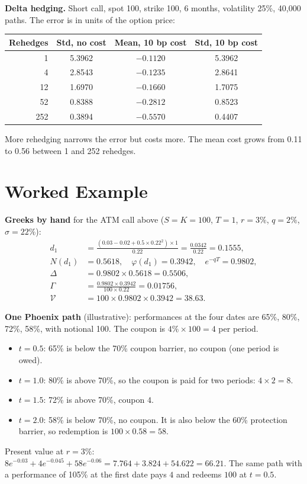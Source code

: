 \documentclass[11pt,a4paper]{article}
\begin{document}
\textbf{Delta hedging.} Short call, spot 100, strike 100, 6 months, volatility 25\%, 40,000 paths. The error is in units of the option price:

\begin{center}
\begin{tabular}{@{}rccc@{}}
\toprule
Rehedges & Std, no cost & Mean, 10 bp cost & Std, 10 bp cost \\
\midrule
1 & 5.3962 & $-0.1120$ & 5.3962 \\
4 & 2.8543 & $-0.1235$ & 2.8641 \\
12 & 1.6970 & $-0.1660$ & 1.7075 \\
52 & 0.8388 & $-0.2812$ & 0.8523 \\
252 & 0.3894 & $-0.5570$ & 0.4407 \\
\bottomrule
\end{tabular}
\end{center}
More rehedging narrows the error but costs more. The mean cost grows from 0.11 to 0.56 between 1 and 252 rehedges.

\section{Worked Example}
\textbf{Greeks by hand} for the ATM call above ($S=K=100$, $T=1$, $r=3\%$, $q=2\%$, $\sigma=22\%$):
\begin{align*}
d_1&=\frac{(0.03-0.02+0.5\times0.22^2)\times1}{0.22}=\frac{0.0342}{0.22}=0.1555,\\
N(d_1)&=0.5618,\quad \varphi(d_1)=0.3942,\quad e^{-qT}=0.9802,\\
\Delta&=0.9802\times0.5618=0.5506,\\
\Gamma&=\frac{0.9802\times0.3942}{100\times0.22}=0.01756,\\
\mathcal{V}&=100\times0.9802\times0.3942=38.63 .
\end{align*}

\textbf{One Phoenix path} (illustrative): performances at the four dates are 65\%, 80\%, 72\%, 58\%, with notional 100. The coupon is $4\%\times100=4$ per period.
\begin{itemize}
\item $t=0.5$: 65\% is below the 70\% coupon barrier, no coupon (one period is owed).
\item $t=1.0$: 80\% is above 70\%, so the coupon is paid for two periods: $4\times2=8$.
\item $t=1.5$: 72\% is above 70\%, coupon $4$.
\item $t=2.0$: 58\% is below 70\%, no coupon. It is also below the 60\% protection barrier, so redemption is $100\times0.58=58$.
\end{itemize}
Present value at $r=3\%$: $8e^{-0.03}+4e^{-0.045}+58e^{-0.06}=7.764+3.824+54.622=66.21$. The same path with a performance of 105\% at the first date pays $4$ and redeems $100$ at $t=0.5$.
\end{document}
